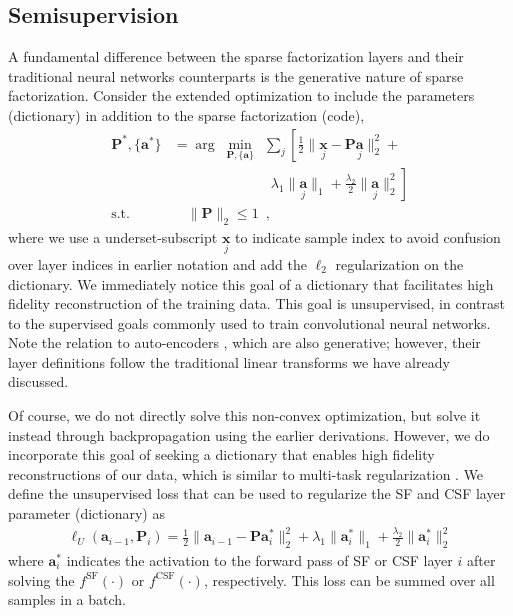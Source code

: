 \documentclass[10pt,twocolumn,letterpaper]{article}
\newcommand{\argmnmz}[1][]{\ensuremath{\arg\;\underset{#1}{\min}\:\:}}
\renewcommand{\vec}{\mathbf}
\newcommand{\loss}{\ensuremath{\ell}}
\newcommand{\x}{\vec{x}}
\renewcommand{\P}{\vec{P}}
\renewcommand{\a}{\vec{a}}
\newcommand{\fSF}{^{\text{SF}}}
\newcommand{\fCSF}{^{\text{CSF}}}
\begin{document}
\subsection{Semisupervision}
\label{sec:semisupervision}

A fundamental difference between the sparse factorization layers and their traditional neural networks counterparts is the generative nature of sparse factorization.  Consider the extended optimization to include the parameters (dictionary) in addition to the sparse factorization (code), 
\begin{align}
    \P^*,\{\a^*\} &=  \argmnmz[\P,\{\a\}] \sum_j \left[ 
    \frac{1}{2}  \lVert \underset{j}{\x}-\P\underset{j}{\a}\rVert_2^2 +
    \right.
    \label{eq:dictionarylearning}    \\
    &\quad\quad\quad\quad\quad\quad\quad \left.  \lambda_1\lVert\underset{j}{\a}\rVert_1+\frac{\lambda_2}{2}\lVert\underset{j}{\a}\rVert_2^2 \right]
   \nonumber\\
    \text{s.t.} & \quad\lVert \P \rVert_2  \le 1
\enspace, \nonumber
\end{align}
where we use a underset-subscript $\underset{j}{\x}$ to indicate sample index to avoid confusion over layer indices in earlier notation and add the $\ell_2$ regularization on the dictionary.
We immediately notice this goal of a dictionary that facilitates high fidelity reconstruction of the training data.  This goal is unsupervised, in contrast to the supervised goals commonly used to train convolutional neural networks.  Note the relation to auto-encoders \cite{HiSaSCIENCE2006}, which are also generative; however, their layer definitions follow the traditional linear transforms we have already discussed.

Of course, we do not directly solve this non-convex optimization, but solve it instead through backpropagation using the earlier derivations.  However, we do incorporate this goal of seeking a dictionary that enables high fidelity reconstructions of our data, which is similar to multi-task regularization \cite{LaMaSharXiv2016,EvPoICKDDM2004}.  We define the unsupervised loss that can be used to regularize the SF and CSF layer parameter (dictionary) as
\begin{align}
    \loss_U(\a_{i-1},\P_i) = \frac{1}{2}  \lVert \a_{i-1}-\P{\a_i^*}\rVert_2^2 + 
    \lambda_1\lVert{\a_i^*}\rVert_1+\frac{\lambda_2}{2}\lVert{\a_i^*}\rVert_2^2 
\end{align}
\noindent where $\a^*_i$ indicates the activation to the forward pass of SF or CSF layer $i$ after solving the $f\fSF(\cdot)$ or $f\fCSF(\cdot)$, respectively.  This loss can be summed over all samples in a batch.
\end{document}
